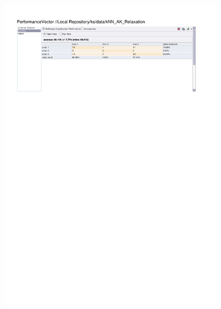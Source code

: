 \begin{figure}[htp]
  \centerline{\includegraphics[trim=0 680 0 60,clip,width=16.09cm]{results/kNN_A_Relaxation.pdf}} \caption{
} \label{kNN_K_Relaxation}
\end{figure}

